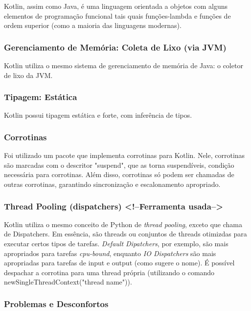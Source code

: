 \documentclass{article}
\begin{document}
Kotlin, assim como Java, é uma linguagem orientada a objetos com alguns elementos de programação funcional tais quais funções-lambda e funções de ordem superior (como a maioria das linguagens modernas).

\subsubsection{Gerenciamento de Memória: Coleta de Lixo (via JVM)}
\label{sssec:kotlin memoria}

Kotlin utiliza o mesmo sistema de gerenciamento de memória de Java: o coletor de lixo da JVM.

\subsubsection{Tipagem: Estática}
\label{sssec:kotlin tipagem}

Kotlin possui tipagem estática e forte, com inferência de tipos.

\subsubsection{Corrotinas}
\label{sssec:kotlin corrotinas}

Foi utilizado um pacote que implementa corrotinas para Kotlin. Nele, corrotinas são marcadas com o descritor "suspend", que as torna suspendíveis, condição necessária para corrotinas. Além disso, corrotinas só podem ser chamadas de outras corrotinas, garantindo sincronização e escalonamento apropriado.

\subsubsection{Thread Pooling (dispatchers) <!--Ferramenta usada-->}
\label{sssec:kotlin thread pooling}

Kotlin utiliza o mesmo conceito de Python de \emph{thread pooling}, exceto que chama de Dispatchers. Em essência, são threads ou conjuntos de threads otimizdas para executar certos tipos de tarefas. \emph{Default Dipatchers}, por exemplo, são mais apropriados para tarefas \emph{cpu-bound}, enquanto \emph{IO Dispatchers} são mais apropriadas para tarefas de input e output (como sugere o nome). É possível despachar a corrotina para uma thread própria (utilizando o comando newSingleThreadContext("thread name")).

\subsubsection{Problemas e Desconfortos}
\label{sssec:kotlin problemas}
\end{document}
